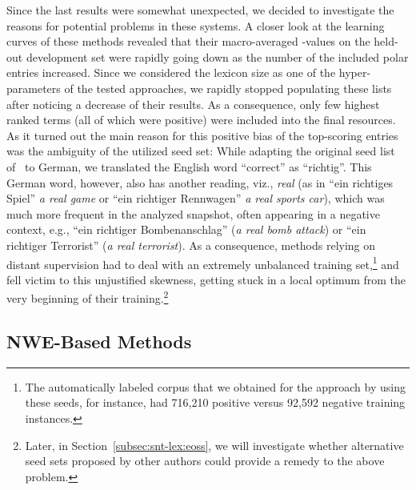 Since the last results were somewhat unexpected, we decided to
investigate the reasons for potential problems in these systems.  A
closer look at the learning curves of these methods revealed that
their macro-averaged \F{}-values on the held-out development set were
rapidly going down as the number of the included polar entries
increased.  Since we considered the lexicon size as one of the
hyper-parameters of the tested approaches, we rapidly stopped
populating these lists after noticing a decrease of their results.  As
a consequence, only few highest ranked terms (all of which were
positive) were included into the final resources.  As it turned out
the main reason for this positive bias of the top-scoring entries was
the ambiguity of the utilized seed set: While adapting the original
seed list of~\citet{Turney:03} to German, we translated the English
word ``correct'' as ``richtig''.  This German word, however, also has
another reading, viz., \emph{real} (as in ``ein richtiges Spiel''
\emph{a real game} or ``ein richtiger Rennwagen'' \emph{a real sports
  car}), which was much more frequent in the analyzed snapshot, often
appearing in a negative context, e.g., ``ein richtiger
Bombenanschlag'' (\emph{a real bomb attack}) or ``ein richtiger
Terrorist'' (\emph{a real terrorist}).  As a consequence, methods
relying on distant supervision had to deal with an extremely
unbalanced training set,\footnote{The automatically labeled corpus
  that we obtained for the approach by \citet{Kiritchenko:14} using
  these seeds, for instance, had 716,210 positive versus 92,592
  negative training instances.} and fell victim to this unjustified
skewness, getting stuck in a local optimum from the very beginning of
their training.\footnote{Later, in Section~\ref{subsec:snt-lex:eoss},
  we will investigate whether alternative seed sets proposed by other
  authors could provide a remedy to the above problem.}

\subsection{NWE-Based Methods}\label{subsec:snt:lex:nwe}

